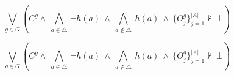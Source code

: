 \documentclass[a4paper]{article}
\begin{document}
\[\bigvee_{g\in G} (C^g \wedge\ \bigwedge_{a\in \triangle}\ \neg h(a)\ \wedge\ \bigwedge_{a\notin \triangle}\ h(a)\ \wedge\ \{O_j^g\}_{j=1}^{|A|} \nvdash\ \bot )\]

\[\bigvee_{g\in G} (C^g \wedge\ \bigwedge_{a\in \triangle}\ \neg h(a)\ \wedge\ \bigwedge_{a\notin \triangle}\ h(a)\ \wedge\ \{O_j^g\}_{j=1}^{|A|} \nvdash\ \bot )\]
\end{document}
